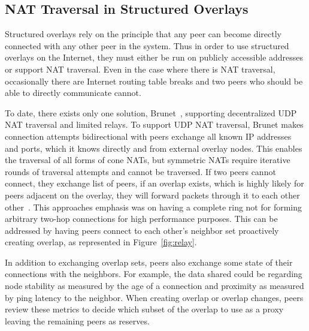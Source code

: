 \subsection{NAT Traversal in Structured Overlays}
Structured overlays rely on the principle that any peer can become directly
connected with any other peer in the system.  Thus in order to use structured
overlays on the Internet, they must either be run on publicly accessible
addresses or support NAT traversal.  Even in the case where there is NAT
traversal, occasionally there are Internet routing table breaks and two
peers who should be able to directly communicate cannot.

To date, there exists only one solution, Brunet~\cite{brunet}, supporting
decentralized UDP NAT traversal and limited relays.  To support UDP NAT
traversal, Brunet makes connection attempts bidirectional with peers exchange
all known IP addresses and ports, which it knows directly and from external
overlay nodes.  This enables the traversal of all forms of cone NATs, but
symmetric NATs require iterative rounds of traversal attempts and cannot be
traversed.  If two peers cannot connect, they exchange list of peers, if an
overlap exists, which is highly likely for peers adjacent on the overlay, they
will forward packets through it to each other other~\cite{hpdc08_1}.  This
approaches emphasis was on having a complete ring not for forming arbitrary
two-hop connections for high performance purposes.  This can be addressed by
having peers connect to each other's neighbor set proactively creating overlap,
as represented in Figure~\ref{fig:relay}.

In addition to exchanging overlap sets, peers also exchange some state of their
connections with the neighbors.  For example, the data shared could be
regarding node stability as measured by the age of a connection and proximity
as measured by ping latency to the neighbor.  When creating overlap or overlap
changes, peers review these metrics to decide which subset of the overlap to
use as a proxy leaving the remaining peers as reserves.


